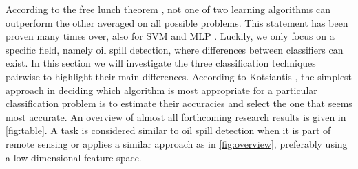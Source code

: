  
According to the free lunch theorem \cite{wolpert1995no}, not one of two learning algorithms can outperform the other averaged on all possible problems. This statement has been proven many times over, also for SVM and MLP \cite{Moavenian20103088,Zanaty2012177,jin2005neural}. Luckily, we only focus on a specific field, namely oil spill detection, where differences between classifiers can exist. In this section we will investigate the three classification techniques pairwise to highlight their main differences. According to Kotsiantis \cite{kotsiantis2007supervised}, the simplest approach in deciding which algorithm is most appropriate for a particular classification problem is to estimate their accuracies and select the one that seems most accurate. An overview of almost all forthcoming research results is given in \ref{fig:table}. A task is considered similar to oil spill detection when it is part of remote sensing or applies a similar approach as in \ref{fig:overview}, preferably using a low dimensional feature space.